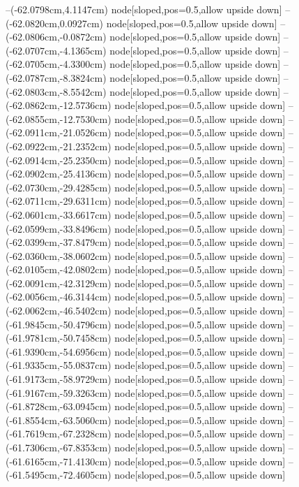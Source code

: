 --(-62.0798cm,4.1147cm) node[sloped,pos=0.5,allow upside down]{\arrowIn}
--(-62.0820cm,0.0927cm) node[sloped,pos=0.5,allow upside down]{\ArrowIn}
--(-62.0806cm,-0.0872cm) node[sloped,pos=0.5,allow upside down]{\arrowIn}
--(-62.0707cm,-4.1365cm) node[sloped,pos=0.5,allow upside down]{\ArrowIn}
--(-62.0705cm,-4.3300cm) node[sloped,pos=0.5,allow upside down]{\arrowIn}
--(-62.0787cm,-8.3824cm) node[sloped,pos=0.5,allow upside down]{\ArrowIn}
--(-62.0803cm,-8.5542cm) node[sloped,pos=0.5,allow upside down]{\arrowIn}
--(-62.0862cm,-12.5736cm) node[sloped,pos=0.5,allow upside down]{\ArrowIn}
--(-62.0855cm,-12.7530cm) node[sloped,pos=0.5,allow upside down]{\arrowIn}
--(-62.0911cm,-21.0526cm) node[sloped,pos=0.5,allow upside down]{\ArrowIn}
--(-62.0922cm,-21.2352cm) node[sloped,pos=0.5,allow upside down]{\arrowIn}
--(-62.0914cm,-25.2350cm) node[sloped,pos=0.5,allow upside down]{\ArrowIn}
--(-62.0902cm,-25.4136cm) node[sloped,pos=0.5,allow upside down]{\arrowIn}
--(-62.0730cm,-29.4285cm) node[sloped,pos=0.5,allow upside down]{\ArrowIn}
--(-62.0711cm,-29.6311cm) node[sloped,pos=0.5,allow upside down]{\arrowIn}
--(-62.0601cm,-33.6617cm) node[sloped,pos=0.5,allow upside down]{\ArrowIn}
--(-62.0599cm,-33.8496cm) node[sloped,pos=0.5,allow upside down]{\arrowIn}
--(-62.0399cm,-37.8479cm) node[sloped,pos=0.5,allow upside down]{\ArrowIn}
--(-62.0360cm,-38.0602cm) node[sloped,pos=0.5,allow upside down]{\arrowIn}
--(-62.0105cm,-42.0802cm) node[sloped,pos=0.5,allow upside down]{\ArrowIn}
--(-62.0091cm,-42.3129cm) node[sloped,pos=0.5,allow upside down]{\arrowIn}
--(-62.0056cm,-46.3144cm) node[sloped,pos=0.5,allow upside down]{\ArrowIn}
--(-62.0062cm,-46.5402cm) node[sloped,pos=0.5,allow upside down]{\arrowIn}
--(-61.9845cm,-50.4796cm) node[sloped,pos=0.5,allow upside down]{\ArrowIn}
--(-61.9781cm,-50.7458cm) node[sloped,pos=0.5,allow upside down]{\arrowIn}
--(-61.9390cm,-54.6956cm) node[sloped,pos=0.5,allow upside down]{\ArrowIn}
--(-61.9335cm,-55.0837cm) node[sloped,pos=0.5,allow upside down]{\arrowIn}
--(-61.9173cm,-58.9729cm) node[sloped,pos=0.5,allow upside down]{\ArrowIn}
--(-61.9167cm,-59.3263cm) node[sloped,pos=0.5,allow upside down]{\arrowIn}
--(-61.8728cm,-63.0945cm) node[sloped,pos=0.5,allow upside down]{\ArrowIn}
--(-61.8554cm,-63.5060cm) node[sloped,pos=0.5,allow upside down]{\arrowIn}
--(-61.7619cm,-67.2328cm) node[sloped,pos=0.5,allow upside down]{\ArrowIn}
--(-61.7306cm,-67.8353cm) node[sloped,pos=0.5,allow upside down]{\arrowIn}
--(-61.6165cm,-71.4130cm) node[sloped,pos=0.5,allow upside down]{\ArrowIn}
--(-61.5495cm,-72.4605cm) node[sloped,pos=0.5,allow upside down]{\ArrowIn}
